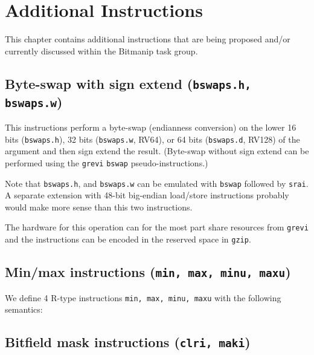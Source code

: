 \chapter{Additional Instructions}

This chapter contains additional instructions that are being proposed and/or
currently discussed within the Bitmanip task group.


\section{Byte-swap with sign extend (\texttt{bswaps.h, bswaps.w})}

This instructions perform a byte-swap (endianness conversion) on the lower 16 bits
(\texttt{bswaps.h}), 32 bits (\texttt{bswaps.w}, RV64), or 64 bits (\texttt{bswaps.d}, RV128)
of the argument and then sign extend the result. (Byte-swap without sign extend can be
performed using the \texttt{grevi} \texttt{bswap} pseudo-instructions.)

Note that \texttt{bswaps.h}, and \texttt{bswaps.w} can be emulated with
\texttt{bswap} followed by \texttt{srai}. A separate extension with 48-bit big-endian
load/store instructions probably would make more sense than this two instructions.



The hardware for this operation can for the most part share resources from
\texttt{grevi} and the instructions can be encoded in the reserved space in \texttt{gzip}.




\section{Min/max instructions (\texttt{min, max, minu, maxu})}

We define 4 R-type instructions \texttt{min, max, minu, maxu} with the
following semantics:






\section{Bitfield mask instructions (\texttt{clri, maki})}

